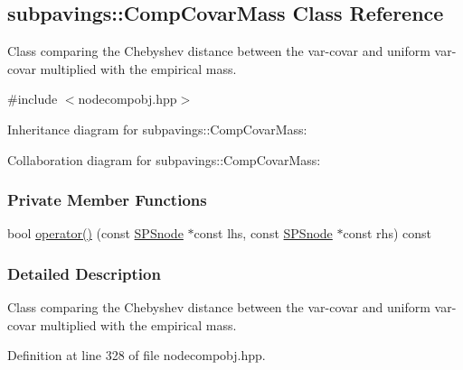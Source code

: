 \hypertarget{classsubpavings_1_1CompCovarMass}{\subsection{subpavings\-:\-:\-Comp\-Covar\-Mass \-Class \-Reference}
\label{classsubpavings_1_1CompCovarMass}
}


\-Class comparing the \-Chebyshev distance between the var-\/covar and uniform var-\/covar multiplied with the empirical mass.  




{\ttfamily \#include $<$nodecompobj.\-hpp$>$}



\-Inheritance diagram for subpavings\-:\-:\-Comp\-Covar\-Mass\-:


\-Collaboration diagram for subpavings\-:\-:\-Comp\-Covar\-Mass\-:
\subsubsection*{\-Private \-Member \-Functions}
\begin{DoxyCompactItemize}
\item 
bool \hyperlink{classsubpavings_1_1CompCovarMass_a3207e61acd3b49bcd678a46870c89766}{operator()} (const \hyperlink{classsubpavings_1_1SPSnode}{\-S\-P\-Snode} $\ast$const lhs, const \hyperlink{classsubpavings_1_1SPSnode}{\-S\-P\-Snode} $\ast$const rhs) const 
\end{DoxyCompactItemize}


\subsubsection{\-Detailed \-Description}
\-Class comparing the \-Chebyshev distance between the var-\/covar and uniform var-\/covar multiplied with the empirical mass. 

\-Definition at line 328 of file nodecompobj.\-hpp.



